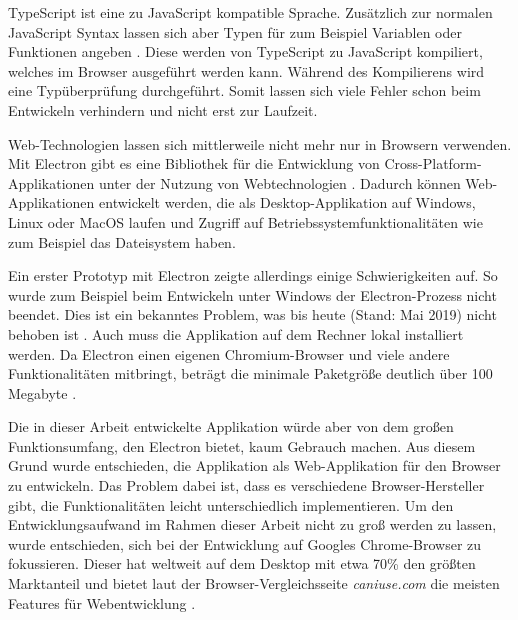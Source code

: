 TypeScript ist eine zu JavaScript kompatible Sprache. Zusätzlich zur normalen JavaScript Syntax lassen sich aber Typen für zum Beispiel Variablen oder Funktionen angeben \cite{typescript:mainpage}. Diese werden von TypeScript zu JavaScript kompiliert, welches im Browser ausgeführt werden kann. Während des Kompilierens wird eine Typüberprüfung durchgeführt. Somit lassen sich viele Fehler schon beim Entwickeln verhindern und nicht erst zur Laufzeit.

Web-Technologien lassen sich mittlerweile nicht mehr nur in Browsern verwenden. Mit Electron gibt es eine Bibliothek für die Entwicklung von Cross-Platform-Applikationen unter der Nutzung von Webtechnologien \cite{electron:about}. Dadurch können Web-Applikationen entwickelt werden, die als Desktop-Applikation auf Windows, Linux oder MacOS laufen und Zugriff auf Betriebssystemfunktionalitäten wie zum Beispiel das Dateisystem haben.

Ein erster Prototyp mit Electron zeigte allerdings einige Schwierigkeiten auf. So wurde zum Beispiel beim Entwickeln unter Windows der Electron-Prozess nicht beendet. Dies ist ein bekanntes Problem, was bis heute (Stand: Mai 2019) nicht behoben ist \cite{electron:processissue}. Auch muss die Applikation auf dem Rechner lokal installiert werden. Da Electron einen eigenen Chromium-Browser und viele andere Funktionalitäten mitbringt, beträgt die minimale Paketgröße deutlich über 100 Megabyte \cite{electron:sizeissue}.

Die in dieser Arbeit entwickelte Applikation würde aber von dem großen Funktionsumfang, den Electron bietet, kaum Gebrauch machen. Aus diesem Grund wurde entschieden, die Applikation als Web-Applikation für den Browser zu entwickeln. Das Problem dabei ist, dass es verschiedene Browser-Hersteller gibt, die Funktionalitäten leicht unterschiedlich implementieren. Um den Entwicklungsaufwand im Rahmen dieser Arbeit nicht zu groß werden zu lassen, wurde entschieden, sich bei der Entwicklung auf Googles Chrome-Browser zu fokussieren. Dieser hat weltweit auf dem Desktop mit etwa 70\% den größten Marktanteil \cite{statcounter:desktopbrowser} und bietet laut der Browser-Vergleichsseite \textit{caniuse.com} die meisten Features für Webentwicklung \cite{caniuse:home}.